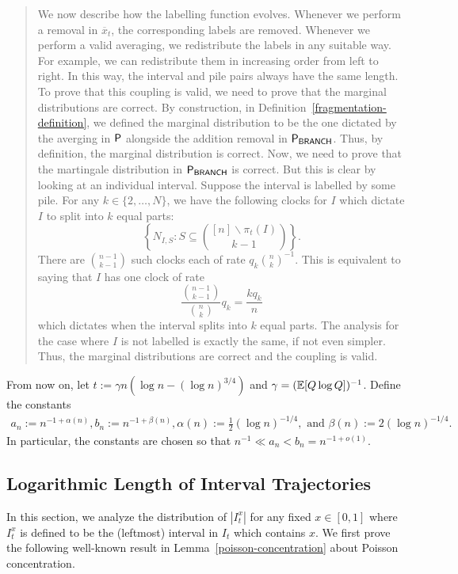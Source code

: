 \documentclass[12pt]{article}
\begin{document}
\begin{quote}
	We now describe how the labelling function evolves. Whenever we perform a removal in $\overline{x}_t$, the corresponding labels are removed. Whenever we perform a valid averaging, we redistribute the labels in any suitable way. For example, we can redistribute them in increasing order from left to right. In this way, the interval and pile pairs always have the same length. \\

	To prove that this coupling is valid, we need to prove that the marginal distributions are correct. By construction, in Definition~\ref{fragmentation-definition}, we defined the marginal distribution to be the one dictated by the averging in $\mathsf{P}$ alongside the addition removal in $\mathsf{P}_{\mathsf{BRANCH}}$. Thus, by definition, the marginal distribution is correct. Now, we need to prove that the martingale distribution in $\mathsf{P}_{\mathsf{BRANCH}}$ is correct. But this is clear by looking at an individual interval. Suppose the interval is labelled by some pile. For any $k \in \{2, \ldots, N\}$, we have the following clocks for $I$ which dictate $I$ to split into $k$ equal parts:
	\[
		\left \{ N_{I, S} : S \subseteq \binom{[n] \backslash \pi_t(I)}{k-1}\right \}.
	\]
	There are $\binom{n-1}{k-1}$ such clocks each of rate $q_k \binom{n}{k}^{-1}$. This is equivalent to saying that $I$ has one clock of rate
	\[
		\frac{\binom{n-1}{k-1}}{\binom{n}{k}} q_k = \frac{kq_k}{n}
	\]
	which dictates when the interval splits into $k$ equal parts. The analysis for the case where $I$ is not labelled is exactly the same, if not even simpler. Thus, the marginal distributions are correct and the coupling is valid. 
\end{quote}
From now on, let $t := \gamma n ( \log n - (\log n)^{3/4})$ and $\gamma = (\mathbb{E}[Q \log Q])^{-1}$. Define the constants
\begin{align*}
	a_n := n^{-1 + \alpha(n)}, b_n := n^{-1 + \beta(n)},  \alpha(n) := \frac{1}{2} (\log n)^{-1/4}, \text{ and } \beta(n) := 2 (\log n)^{-1/4}.
\end{align*}
In particular, the constants are chosen so that $n^{-1} \ll a_n < b_n = n^{-1 + o(1)}$. 

\subsection{Logarithmic Length of Interval Trajectories}
In this section, we analyze the distribution of $|I_t^x|$ for any fixed $x \in [0, 1]$ where $I_t^x$ is defined to be the (leftmost) interval in $I_t$ which contains $x$. We first prove the following well-known result in Lemma~\ref{poisson-concentration} about Poisson concentration. 
\end{document}
